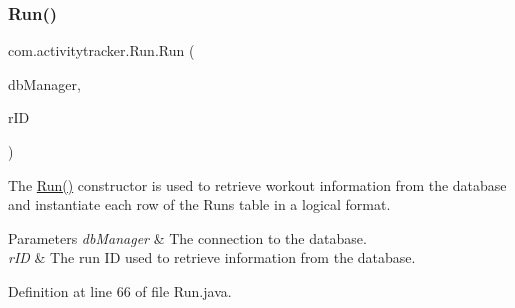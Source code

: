 \subsubsection{\texorpdfstring{Run()}{Run()}}
{\footnotesize\ttfamily com.\+activitytracker.\+Run.\+Run (\begin{DoxyParamCaption}\item[{final \mbox{\hyperlink{classcom_1_1activitytracker_1_1_d_b_manager}{D\+B\+Manager}}}]{db\+Manager,  }\item[{final int}]{r\+ID }\end{DoxyParamCaption})\hspace{0.3cm}{\ttfamily [package]}}

The \mbox{\hyperlink{classcom_1_1activitytracker_1_1_run_a5568c1c514835056d2abc22cfba222c5}{Run()}} constructor is used to retrieve workout information from the database and instantiate each row of the Runs table in a logical format.


\begin{DoxyParams}{Parameters}
{\em db\+Manager} & The connection to the database. \\
\hline
{\em r\+ID} & The run ID used to retrieve information from the database. \\
\hline
\end{DoxyParams}


Definition at line 66 of file Run.\+java.


